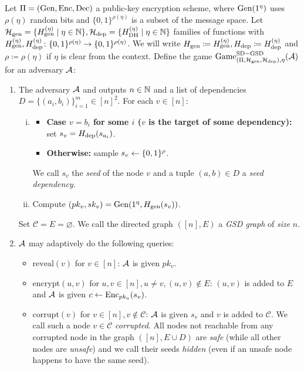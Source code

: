 \begin{definition} \label{def:sd-gsd-game}
	Let $\Pi = (\mathrm{Gen}, \mathrm{Enc}, \mathrm{Dec})$ a public-key encryption scheme, where $\mathrm{Gen}(1^\eta)$ uses $\rho(\eta)$ random bits and $\{0, 1\}^{\rho(\eta)}$ is a subset of the message space.
	Let $\mathcal{H}_\mathrm{gen} = \{ H_\mathrm{gen}^{(\eta)} \mid \eta \in \mathbb{N}\}, \mathcal{H}_\mathrm{dep} = \{ H_\mathrm{DH}^{(\eta)} \mid \eta \in \mathbb{N}\}$ families of functions with $H_\mathrm{gen}^{(\eta)}, H_\mathrm{dep}^{(\eta)} \colon \{0, 1\}^{\rho(\eta)} \to \{0, 1\}^{\rho(\eta)}$. We will write $H_\mathrm{gen} \coloneqq H_\mathrm{gen}^{(\eta)}, H_\mathrm{dep} \coloneqq H_\mathrm{dep}^{(\eta)}$ and $\rho \coloneqq \rho(\eta)$ if $\eta$ is clear from the context.
	Define the game $\mathrm{Game}_{(\Pi, \mathcal{H}_\mathrm{gen}, \mathcal{H}_\mathrm{dep}), \eta}^{\mathrm{SD-GSD}}(\mathcal{A})$ for an adversary $\mathcal{A}$:
	\begin{enumerate}[1.]
		\item \label{def:sd-gsd-game-step-init} The adversary $\mathcal{A}$ and outputs $n \in \mathbb{N}$ and a list of dependencies $D = \{(a_{i}, b_{i})\}_{i=1}^m \in [n]^2$. For each $v \in [n]$:
		      \begin{enumerate}[(i)]
			      \item \begin{itemize}
				            \item \textbf{Case $v = b_i$ for some $i$ ($v$ is the target of some dependency):} set $s_v = H_\mathrm{dep}(s_{a_i})$.
				            \item \textbf{Otherwise:} sample $s_v \leftarrow \{0, 1\}^\rho$.
			            \end{itemize}
			            We call $s_v$ the \emph{seed} of the node $v$ and a tuple $(a, b) \in D$ a \emph{seed dependency}.
			      \item Compute $(pk_v, sk_v) = \mathrm{Gen}(1^\eta, H_\mathrm{gen}(s_v))$.
		      \end{enumerate}
		      Set $\mathcal{C} = E = \varnothing$. We call the directed graph $([n], E)$ a \emph{GSD graph} of \emph{size} $n$.
		\item $\mathcal{A}$ may adaptively do the following queries:
		      \begin{itemize}
			      \item $\mathrm{reveal}(v)$ for $v \in [n]$: $\mathcal{A}$ is given $pk_v$.
			      \item $\mathrm{encrypt}(u, v)$ for $u, v \in [n], u \neq v, (u, v) \notin E$: $(u, v)$ is added to $E$ and $\mathcal{A}$ is given $c \leftarrow \mathrm{Enc}_{pk_u}(s_v)$.
			      \item $\mathrm{corrupt}(v)$ for $v \in [n], v \notin \mathcal{C}$: $\mathcal{A}$ is given $s_v$ and $v$ is added to $\mathcal{C}$. We call such a node $v \in \mathcal{C}$ \emph{corrupted}. All nodes not reachable from any corrupted node in the graph $([n], E \cup D)$ are \emph{safe} (while all other nodes are \emph{unsafe}) and we call their seeds \emph{hidden} (even if an unsafe node happens to have the same seed).

\end{itemize}
\end{enumerate}
\end{definition}

